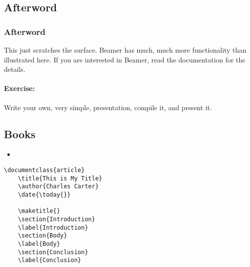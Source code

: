 \begin{realverbatim}
    \section{Afterword}
    \begin{frame}
        \frametitle{Afterword}
        This just scratches the surface. Beamer has much, much more functionality than illustrated here. If you are interested in Beamer, read the documentation for the details.
    \end{frame}

        \end{realverbatim}

        \paragraph{Exercise:} Write your own, very simple, presentation, compile it, and present it.


        \subsection{Books}
        \label{Books}
        
        \begin{framed}
            \begin{itemize}
                \item{}
            \end{itemize}
        \end{framed}


        \begin{verbatim}
\documentclass{article}
    \title{This is My Title}
    \author{Charles Carter}
    \date{\today{}}
 
    \maketitle{}
    \section{Introduction}
    \label{Introduction}
    \section{Body}
    \label{Body}
    \section{Conclusion}
    \label{Conclusion}
    
        \end{verbatim}

